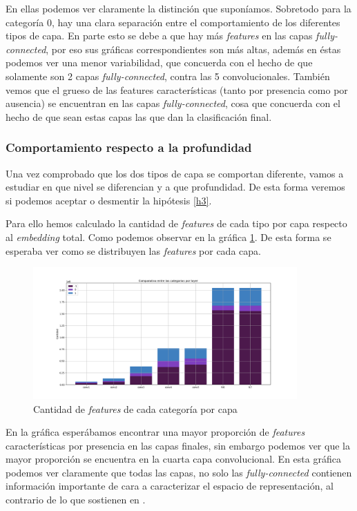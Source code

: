 \documentclass[12,twoside]{TFG-GM}
\theoremstyle{definition}
\theoremstyle{remark}
\begin{document}
En ellas podemos ver claramente la distinción que suponíamos. Sobretodo para la categoría 0, hay una clara separación entre el comportamiento de los diferentes tipos de capa. En parte esto se debe a que hay más \textit{features} en las capas \textit{fully-connected}, por eso sus gráficas correspondientes son más altas, además en éstas podemos ver una menor variabilidad, que concuerda con el hecho de que solamente son 2 capas \textit{fully-connected}, contra las 5 convolucionales. También vemos que el grueso de las features características (tanto por presencia como por ausencia) se encuentran en las capas \textit{fully-connected}, cosa que concuerda con el hecho de que sean estas capas las que dan la clasificación final. 
 
\subsubsection{Comportamiento respecto a la profundidad}

Una vez comprobado que los dos tipos de capa se comportan diferente, vamos a estudiar en que nivel se diferencian y a que profundidad. De esta forma veremos si podemos aceptar o desmentir la hipótesis \ref{h3}. 

Para ello hemos calculado la cantidad de \textit{features} de cada tipo por capa respecto al \textit{embedding} total. Como podemos observar en la gráfica \ref{fig:totalfeaturesperlayer}. De esta forma se esperaba ver como se distribuyen las \textit{features} por cada capa.


\begin{figure}[ht] 
	\centering
	\includegraphics[width=0.9\textwidth] {Images/plots/25/Comparative_of_synsets_all.png}
	\caption{ Cantidad de \textit{features} de cada categoría por capa
	\label{fig:totalfeaturesperlayer}}
\end{figure}

En la gráfica esperábamos encontrar una mayor proporción de \textit{features} características por presencia en las capas finales, sin embargo podemos ver que la mayor proporción se encuentra en la cuarta capa convolucional. En esta gráfica podemos ver claramente que todas las capas, no solo las \textit{fully-connected} contienen información importante de cara a caracterizar el espacio de representación, al contrario de lo que sostienen en \cite{onlylastlayers}.
\end{document}
